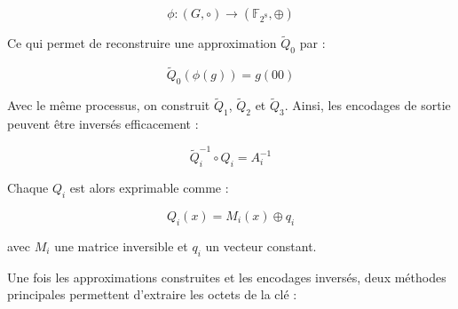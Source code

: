 \documentclass[a4paper, 10pt]{article}
\begin{document}
\[
  \phi : (G, \circ) \rightarrow (\mathbb{F}_{2^{8}}, \oplus)
\]

Ce qui permet de reconstruire une approximation $\widetilde{Q}_0$ par :

\[
  \widetilde{Q}_{0}(\phi(g)) = g(00)
\]

Avec le même processus, on construit $\widetilde{Q}_1$, $\widetilde{Q}_2$ et $\widetilde{Q}_3$. Ainsi, les encodages de sortie peuvent être inversés efficacement :

\[
  \widetilde{Q}_{i}^{-1} \circ Q_{i} = A_{i}^{-1}
\]

Chaque $Q_i$ est alors exprimable comme :

\[
  Q_{i}(x) = M_{i}(x) \oplus q_{i}
\]

avec $M_i$ une matrice inversible et $q_i$ un vecteur constant.

Une fois les approximations construites et les encodages inversés, deux méthodes principales permettent d'extraire les octets de la clé :
\end{document}
